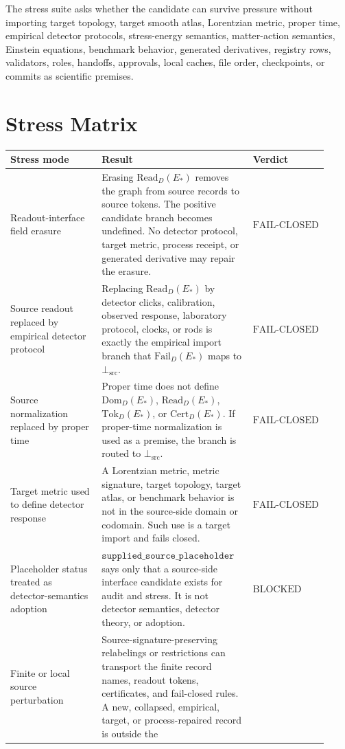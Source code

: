 \documentclass[11pt]{article}
\newcommand{\DomD}{\mathrm{Dom}_{D}(E_{\ast})}
\newcommand{\ReadD}{\mathrm{Read}_{D}(E_{\ast})}
\newcommand{\TokD}{\mathrm{Tok}_{D}(E_{\ast})}
\newcommand{\CertD}{\mathrm{Cert}_{D}(E_{\ast})}
\newcommand{\FailD}{\mathrm{Fail}_{D}(E_{\ast})}
\newcommand{\BottomSrc}{\bot_{\mathrm{src}}}
\newcommand{\FailClosed}{\mathrm{FAIL}\mbox{-}\mathrm{CLOSED}}
\newcommand{\Blocked}{\mathrm{BLOCKED}}
\begin{document}
The stress suite asks whether the candidate can survive pressure without
importing target topology, target smooth atlas, Lorentzian metric, proper
time, empirical detector protocols, stress-energy semantics, matter-action
semantics, Einstein equations, benchmark behavior, generated derivatives,
registry rows, validators, roles, handoffs, approvals, local caches, file
order, checkpoints, or commits as scientific premises.

\section{Stress Matrix}

\begin{longtable}{p{0.30\linewidth}p{0.48\linewidth}p{0.14\linewidth}}
\toprule
Stress mode & Result & Verdict \\
\midrule
Readout-interface field erasure &
Erasing \(\ReadD\) removes the graph from source records to source tokens.
The positive candidate branch becomes undefined. No detector protocol,
target metric, process receipt, or generated derivative may repair the
erasure. & \(\FailClosed\) \\
Source readout replaced by empirical detector protocol &
Replacing \(\ReadD\) by detector clicks, calibration, observed response,
laboratory protocol, clocks, or rods is exactly the empirical import branch
that \(\FailD\) maps to \(\BottomSrc\). & \(\FailClosed\) \\
Source normalization replaced by proper time &
Proper time does not define \(\DomD\), \(\ReadD\), \(\TokD\), or \(\CertD\).
If proper-time normalization is used as a premise, the branch is routed to
\(\BottomSrc\). & \(\FailClosed\) \\
Target metric used to define detector response &
A Lorentzian metric, metric signature, target topology, target atlas, or
benchmark behavior is not in the source-side domain or codomain. Such use is
a target import and fails closed. & \(\FailClosed\) \\
Placeholder status treated as detector-semantics adoption &
\(\texttt{supplied\_source\_placeholder}\) says only that a source-side
interface candidate exists for audit and stress. It is not detector
semantics, detector theory, or adoption. & \(\Blocked\) \\
Finite or local source perturbation &
Source-signature-preserving relabelings or restrictions can transport the
finite record names, readout tokens, certificates, and fail-closed rules. A
new, collapsed, empirical, target, or process-repaired record is outside the

\end{longtable}
\end{document}
